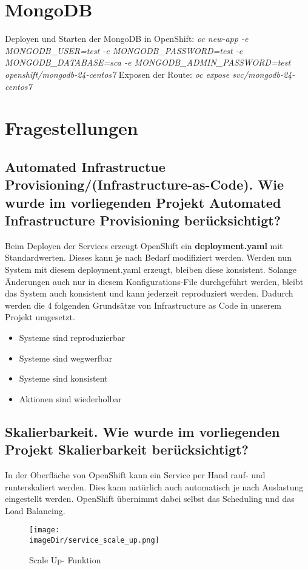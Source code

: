 \documentclass[11pt, a4paper]{article}   	%
\newcommand{\imageDir}{images}
\begin{document}
\section{MongoDB}
Deployen und Starten der MongoDB in OpenShift: \newline
\textit{oc new-app -e MONGODB\_USER=test -e MONGODB\_PASSWORD=test -e MONGODB\_DATABASE=sca -e MONGODB\_ADMIN\_PASSWORD=test openshift/mongodb-24-centos7} \newline
Exposen der Route: \newline
\textit{oc expose svc/mongodb-24-centos7}

\section{Fragestellungen}
\subsection{Automated Infrastructue Provisioning/(Infrastructure-as-Code). Wie wurde im vorliegenden Projekt Automated Infrastructure Provisioning berücksichtigt?}
Beim Deployen der Services erzeugt OpenShift ein \textbf{deployment.yaml} mit Standardwerten. Dieses kann je nach Bedarf modifiziert werden. Werden nun System mit diesem deployment.yaml erzeugt, bleiben diese konsistent. Solange Änderungen auch nur in diesem Konfigurations-File durchgeführt werden, bleibt das System auch konsistent und kann jederzeit reproduziert werden.
Dadurch werden die 4 folgenden Grundsätze von Infrastructure as Code in unserem Projekt umgesetzt.

\begin{itemize}
	\item Systeme sind reproduzierbar
	\item Systeme sind wegwerfbar
	\item Systeme sind konsistent
	\item Aktionen sind wiederholbar
\end{itemize}


\subsection{Skalierbarkeit. Wie wurde im vorliegenden Projekt Skalierbarkeit berücksichtigt?}
In der Oberfläche von OpenShift kann ein Service per Hand rauf- und runterskaliert werden. Dies kann natürlich auch automatisch je nach Auslastung eingestellt werden.
OpenShift übernimmt dabei selbst das Scheduling und das Load Balancing.
\begin{figure}[H]
	\centering
	\texttt{[image: \\imageDir/service\_scale\_up.png]}
	\caption{Scale Up- Funktion}
	\label{fig:scale}
\end{figure}
\end{document}
